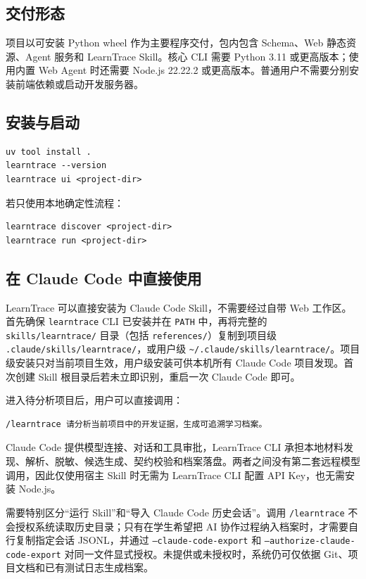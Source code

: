 \documentclass[UTF8,a4paper,12pt]{ctexart}
\begin{document}
\subsection{交付形态}

项目以可安装 Python wheel 作为主要程序交付，包内包含 Schema、Web 静态资源、Agent 服务和 LearnTrace Skill。核心 CLI 需要 Python 3.11 或更高版本；使用内置 Web Agent 时还需要 Node.js 22.22.2 或更高版本。普通用户不需要分别安装前端依赖或启动开发服务器。

\subsection{安装与启动}

\begin{lstlisting}
uv tool install .
learntrace --version
learntrace ui <project-dir>
\end{lstlisting}

若只使用本地确定性流程：

\begin{lstlisting}
learntrace discover <project-dir>
learntrace run <project-dir>
\end{lstlisting}

\subsection{在 Claude Code 中直接使用}

LearnTrace 可以直接安装为 Claude Code Skill，不需要经过自带 Web 工作区。首先确保 \texttt{learntrace} CLI 已安装并在 \texttt{PATH} 中，再将完整的 \texttt{skills/learntrace/} 目录（包括 \texttt{references/}）复制到项目级 \texttt{.claude/skills/learntrace/}，或用户级 \texttt{\textasciitilde/.claude/skills/learntrace/}。项目级安装只对当前项目生效，用户级安装可供本机所有 Claude Code 项目发现。首次创建 Skill 根目录后若未立即识别，重启一次 Claude Code 即可。

进入待分析项目后，用户可以直接调用：

\begin{lstlisting}
/learntrace 请分析当前项目中的开发证据，生成可追溯学习档案。
\end{lstlisting}

Claude Code 提供模型连接、对话和工具审批，LearnTrace CLI 承担本地材料发现、解析、脱敏、候选生成、契约校验和档案落盘。两者之间没有第二套远程模型调用，因此仅使用宿主 Skill 时无需为 LearnTrace CLI 配置 API Key，也无需安装 Node.js。

需要特别区分“运行 Skill”和“导入 Claude Code 历史会话”。调用 \texttt{/learntrace} 不会授权系统读取历史目录；只有在学生希望把 AI 协作过程纳入档案时，才需要自行复制指定会话 JSONL，并通过 \texttt{--claude-code-export} 和 \texttt{--authorize-claude-code-export} 对同一文件显式授权。未提供或未授权时，系统仍可仅依据 Git、项目文档和已有测试日志生成档案。
\end{document}
